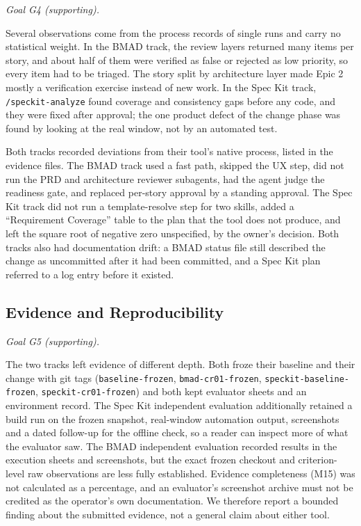 \documentclass[conference]{IEEEtran}
\begin{document}
\emph{Goal G4 (supporting).}

Several observations come from the process records of single runs and
carry no statistical weight. In the BMAD track, the review layers
returned many items per story, and about half of them were verified as
false or rejected as low priority, so every item had to be triaged. The
story split by architecture layer made Epic 2 mostly a verification
exercise instead of new work. In the Spec Kit track,
\texttt{/speckit-analyze} found coverage and consistency gaps before any
code, and they were fixed after approval; the one product defect of the
change phase was found by looking at the real window, not by an
automated test.

Both tracks recorded deviations from their tool's native process, listed
in the evidence files. The BMAD track used a fast path, skipped the UX
step, did not run the PRD and architecture reviewer subagents, had the
agent judge the readiness gate, and replaced per-story approval by a
standing approval. The Spec Kit track did not run a template-resolve
step for two skills, added a ``Requirement Coverage'' table to the plan
that the tool does not produce, and left the square root of negative
zero unspecified, by the owner's decision. Both tracks also had
documentation drift: a BMAD status file still described the change as
uncommitted after it had been committed, and a Spec Kit plan referred to
a log entry before it existed.

\subsection{Evidence and
Reproducibility}\label{evidence-and-reproducibility}

\emph{Goal G5 (supporting).}

The two tracks left evidence of different depth. Both froze their
baseline and their change with git tags (\texttt{baseline-frozen},
\texttt{bmad-cr01-frozen}, \texttt{speckit-baseline-frozen},
\texttt{speckit-cr01-frozen}) and both kept evaluator sheets and an
environment record. The Spec Kit independent evaluation additionally
retained a build run on the frozen snapshot, real-window automation
output, screenshots and a dated follow-up for the offline check, so a
reader can inspect more of what the evaluator saw. The BMAD independent
evaluation recorded results in the execution sheets and screenshots, but
the exact frozen checkout and criterion-level raw observations are less
fully established. Evidence completeness (M15) was not calculated as a
percentage, and an evaluator's screenshot archive must not be credited
as the operator's own documentation. We therefore report a bounded
finding about the submitted evidence, not a general claim about either
tool.
\end{document}
